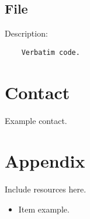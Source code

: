 \documentclass[12pt,a4paper]{article}
\begin{document}
\subsection{File}

\begin{center}
Description:
	\begin{verbatim}
	Verbatim code.
	\end{verbatim}
\end{center}


\section{Contact}

Example contact.


\section{Appendix}
Include resources here.

\begin{itemize}
	\item Item example.
\end{itemize}





\end{document}
